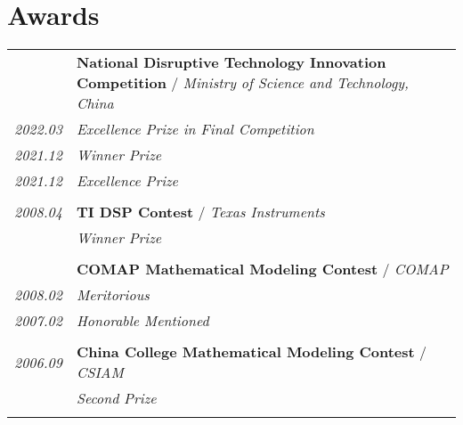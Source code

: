 \documentclass[paper=a4,fontsize=11pt]{scrartcl}
\begin{document}
\section*{Awards}

\begin{longtable}{r|p{11cm}}
	
	~ & \textbf{National Disruptive Technology Innovation Competition}  / \emph{Ministry of Science and Technology, China}\\
	\emph{2022.03} & \emph{Excellence Prize in Final Competition}\\
	\emph{2021.12} & \emph{Winner Prize}\\
	\emph{2021.12} & \emph{Excellence Prize}\\
	\multicolumn{2}{c}{} \\
	
	
	
	\emph{2008.04} & \textbf{TI DSP Contest} / \emph{Texas Instruments} \\
	& \emph{Winner Prize}\\
	\multicolumn{2}{c}{} \\
	
	
	~ & \textbf{COMAP Mathematical Modeling Contest} / \emph{COMAP}\\
	\emph{2008.02} & \emph{Meritorious}\\
	
	
	\emph{2007.02} 	& \emph{Honorable Mentioned}\\
	\multicolumn{2}{c}{} \\
	
	
	\emph{2006.09} & \textbf{China College Mathematical Modeling Contest} / \emph{CSIAM}\\
	& \emph{Second Prize}\\
	\multicolumn{2}{c}{}
	
	
\end{longtable}
\end{document}
